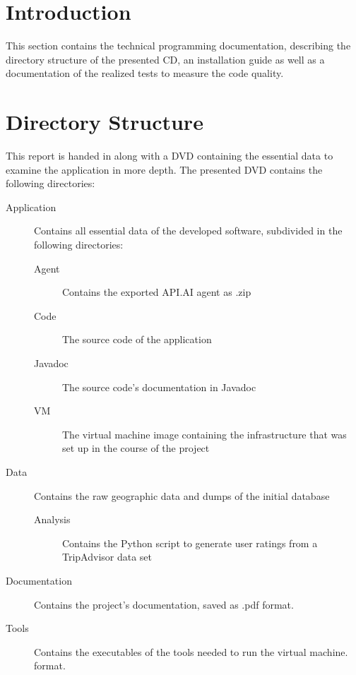 
\section{Introduction}
This section contains the technical programming documentation, describing the directory structure of the presented CD, an installation guide as well as a documentation of the realized tests to measure the code quality.

\section{Directory Structure}
This report is handed in along with a DVD containing the essential data to examine the application in more depth. The presented DVD contains the following directories:
\begin{description}
\item[Application] 
Contains all essential data of the developed software, subdivided in the following directories:
\begin{description}
\item[Agent] Contains the exported API.AI agent as .zip
\item[Code] The source code of the application
\item[Javadoc] The source code’s documentation in Javadoc 
\item[VM] The virtual machine image containing the infrastructure that was set up in the course of the project
\end{description}
\item[Data] Contains the raw geographic data and dumps of the initial database 
\begin{description}
\item[Analysis] Contains the Python script to generate user ratings from a TripAdvisor data set 
\end{description}
\item[Documentation] 
Contains the project’s documentation, saved as .pdf format.
\item[Tools] 
Contains the executables of the tools needed to run the virtual machine. 
format.
\end{description}

